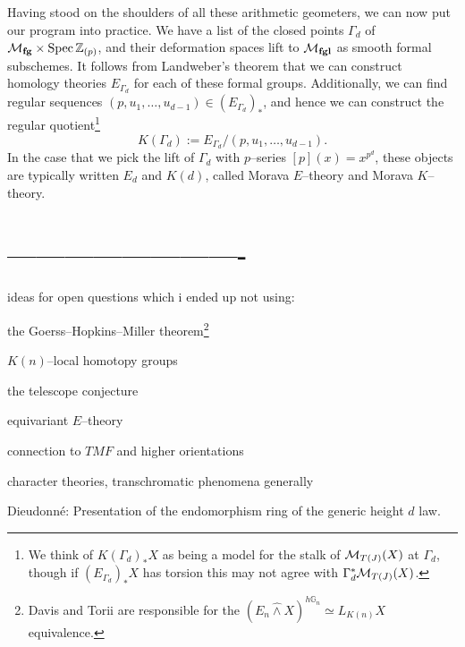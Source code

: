 

Having stood on the shoulders of all these arithmetic geometers, we can now put our program into practice.  We have a list of the closed points $\Gamma_d$ of $\mathcal{M}_{\mathbf{fg}} \times \operatorname{Spec} \mathbb Z_{(p)}$, and their deformation spaces lift to $\mathcal{M}_{\mathbf{fgl}}$ as smooth formal subschemes.  It follows from Landweber's theorem that we can construct homology theories $E_{\Gamma_d}$ for each of these formal groups.  Additionally, we can find regular sequences $(p, u_1, \ldots, u_{d-1}) \in (E_{\Gamma_d})_*$, and hence we can construct the regular quotient\footnote{We think of $K(\Gamma_d)_* X$ as being a model for the stalk of $\mathcal{M}_{T(J)}(X)$ at $\Gamma_d$, though if $(E_{\Gamma_d})_* X$ has torsion this may not agree with $\Gamma_d^* \mathcal{M}_{T(J)}(X)$.} \[K(\Gamma_d) := E_{\Gamma_d} / (p, u_1, \ldots, u_{d-1}).\]  In the case that we pick the lift of $\Gamma_d$ with $p$--series $[p](x) = x^{p^d}$, these objects are typically written $E_d$ and $K(d)$, called Morava $E$--theory and Morava $K$--theory.










\section*{-------------------------}




ideas for open questions which i ended up not using:


the Goerss--Hopkins--Miller theorem\footnote{Davis and Torii are responsible for the $(E_n \hat\wedge X)^{h\mathbb G_n} \simeq L_{K(n)} X$ equivalence.}

$K(n)$--local homotopy groups

the telescope conjecture

equivariant $E$--theory

connection to $TMF$ and higher orientations

character theories, transchromatic phenomena generally

Dieudonn\'e: Presentation of the endomorphism ring of the generic height $d$ law.


